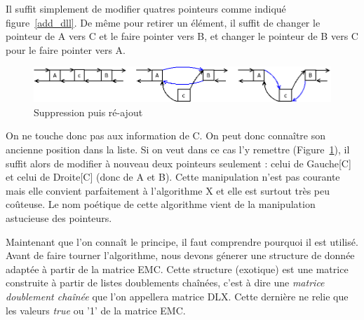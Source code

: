 \documentclass[a4paper]{article}
\begin{document}
Il suffit simplement de modifier quatres pointeurs comme indiqué 
figure~\ref{add_dll}. De même pour retirer un élément, il suffit de changer le 
pointeur de A vers C et le faire pointer vers B, et changer le pointeur de 
B vers C pour le faire pointer vers A. 

\begin{figure}[h]
\begin{center}
\includegraphics[scale=0.5]{../imports/delete.png}
\caption{\label{delete_dll} Suppression puis ré-ajout}
\end{center}
\end{figure}

On ne touche donc pas aux information de C. 
On peut donc connaître son ancienne position dans la liste. Si on veut
dans ce cas l'y remettre (Figure~\ref{delete_dll}), il suffit alors de modifier
à nouveau deux pointeurs
seulement : celui de Gauche[C] et celui de Droite[C] (donc de A et B).
Cette manipulation n'est pas courante mais elle convient parfaitement à 
l'algorithme X et elle est surtout très peu coûteuse.
Le nom poétique de cette algorithme vient de la manipulation astucieuse des 
pointeurs.

Maintenant que l'on connaît le principe, il faut comprendre pourquoi il est
utilisé. Avant de faire tourner l'algorithme, nous devons génerer une structure
de donnée adaptée à partir de la matrice EMC. Cette structure (exotique) 
est une matrice construite à partir de listes doublements
 chaînées, c'est à dire une \emph{matrice doublement chaînée} que l'on appellera 
 matrice DLX. Cette dernière ne relie que les valeurs \emph{true} ou '1' de
 la matrice EMC.
\end{document}
